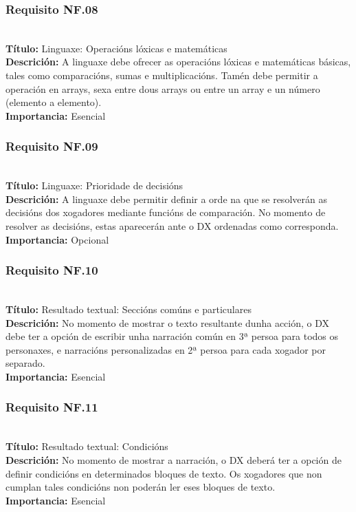 \subsubsection{Requisito NF.08}~\\
{\bf Título:} Linguaxe: Operacións lóxicas e matemáticas\\
{\bf Descrición:} A linguaxe debe ofrecer as operacións lóxicas e matemáticas
básicas, tales como comparacións, sumas e multiplicacións. Tamén debe permitir
a operación en arrays, sexa entre dous arrays ou entre un array e un número
(elemento a elemento).\\
{\bf Importancia:} Esencial

\subsubsection{Requisito NF.09}~\\
{\bf Título:} Linguaxe: Prioridade de decisións\\
{\bf Descrición:} A linguaxe debe permitir definir a orde na que se resolverán
as decisións dos xogadores mediante funcións de comparación. No momento de
resolver as decisións, estas aparecerán ante o DX ordenadas como corresponda.\\
{\bf Importancia:} Opcional

\subsubsection{Requisito NF.10}~\\
{\bf Título:} Resultado textual: Seccións comúns e particulares\\
{\bf Descrición:} No momento de mostrar o texto resultante dunha acción, o DX
debe ter a opción de escribir unha narración común en 3ª persoa para todos os
personaxes, e narracións personalizadas en 2ª persoa para cada xogador por separado.\\
{\bf Importancia:} Esencial

\subsubsection{Requisito NF.11}~\\
{\bf Título:} Resultado textual: Condicións\\
{\bf Descrición:} No momento de mostrar a narración, o DX deberá ter a opción de
definir condicións en determinados bloques de texto. Os xogadores que non
cumplan tales condicións non poderán ler eses bloques de texto.\\
{\bf Importancia:} Esencial

